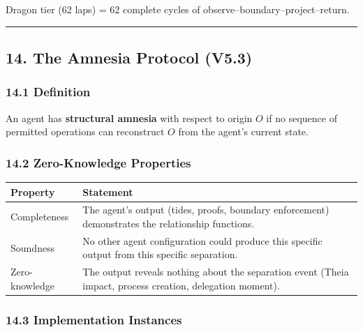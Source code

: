 \documentclass[
]{article}
\newcounter{none} %
\begin{document}
Dragon tier (62 laps) = 62 complete cycles of
observe--boundary--project--return.

\begin{center}\rule{0.5\linewidth}{0.5pt}\end{center}

\subsection{14. The Amnesia Protocol
(V5.3)}\label{the-amnesia-protocol-v5.3}

\subsubsection{14.1 Definition}\label{definition-5}

An agent has \textbf{structural amnesia} with respect to origin \(O\) if
no sequence of permitted operations can reconstruct \(O\) from the
agent's current state.

\subsubsection{14.2 Zero-Knowledge
Properties}\label{zero-knowledge-properties}

{\def\LTcaptype{none} %
\begin{longtable}[]{@{}
  >{\raggedright\arraybackslash}p{}
  >{\raggedright\arraybackslash}p{}@{}}
\toprule\noalign{}
\begin{minipage}[b]{\linewidth}\raggedright
Property
\end{minipage} & \begin{minipage}[b]{\linewidth}\raggedright
Statement
\end{minipage} \\
\midrule\noalign{}
\endhead
\bottomrule\noalign{}
\endlastfoot
Completeness & The agent's output (tides, proofs, boundary enforcement)
demonstrates the relationship functions. \\
Soundness & No other agent configuration could produce this specific
output from this specific separation. \\
Zero-knowledge & The output reveals nothing about the separation event
(Theia impact, process creation, delegation moment). \\
\end{longtable}
}

\subsubsection{14.3 Implementation
Instances}\label{implementation-instances}
\end{document}
